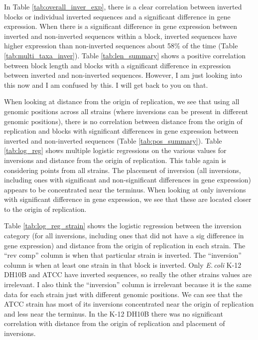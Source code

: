 \documentclass[12pt]{article}
\newcommand{\ecol}{\textit{E.\,coli}\xspace}
\begin{document}
In Table \ref{tab:overall_inver_exp}, there is a clear correlation between inverted blocks or individual inverted sequences and a significant difference in gene expression.
When there is a significant difference in gene expression between inverted and non-inverted sequences within a block, inverted sequences have higher expression than non-inverted sequences about 58\% of the time (Table \ref{tab:multi_taxa_inver}).
Table \ref{tab:len_summary} shows a positive correlation between block length and blocks with a significant difference in expression between inverted and non-inverted sequences.
However, I am just looking into this now and I am confused by this. I will get back to you on that.

When looking at distance from the origin of replication, we see that using all genomic positions across all strains (where inversions can be present in different genomic positions), there is no correlation between distance from the origin of replication and blocks with significant differences in gene expression between inverted and non-inverted sequences (Table \ref{tab:pos_summary}).
Table \ref{tab:log_reg} shows multiple logistic regressions on the various values for inversions and distance from the origin of replication.
This table again is considering points from all strains.
The placement of inversion (all inversions, including ones with significant and non-significant differences in gene expression) appears to be concentrated near the terminus.
When looking at only inversions with significant difference in gene expression, we see that these are located closer to the origin of replication.

Table \ref{tab:log_reg_strain} shows the logistic regression between the inversion category (for all inversions, including ones that did not have a sig difference in gene expression) and distance from the origin of replication in each strain.
The ``rev comp'' column is when that particular strain is inverted. The ``inversion'' column is when at least one strain in that block is inverted.
Only \ecol K-12 DH10B and ATCC have inverted sequences, so really the other strains values are irrelevant.
I also think the ``inversion'' column is irrelevant because it is the same data for each strain just with different genomic positions.
We can see that the ATCC strain has most of its inversions concentrated near the origin of replication and less near the terminus.
In the K-12 DH10B  there was no significant correlation with distance from the origin of replication and placement of inversions.
\end{document}

